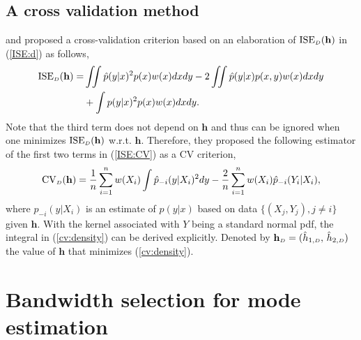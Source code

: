 \documentclass[fleqn,12pt,twoside]{article}
\newcommand{\ISE}{\mathrm{ISE}}
\newcommand{\bh}{\mathbf{h}}
\numberwithin{equation}{section}
\begin{document}
\subsection{A cross validation method}
\cite{Fan.Yim2004} and \cite{Hall.etal2004} proposed a cross-validation criterion based on an elaboration of $\ISE_{\hbox {\tiny $D$}}(\bh)$ in (\ref{ISE:d}) as follows,  
\begin{equation}\label{ISE:CV}
\begin{aligned}
\ISE_{\hbox {\tiny $D$}}(\bh) = &\iint \hat{p}(y|x)^2 p(x)w(x)dxdy - 2 \iint \hat{p}(y|x) p(x,y)w(x) dxdy\\
 & + \int p(y|x)^2 p(x)w(x)dxdy.
\end{aligned}
\end{equation}
Note that the third term does not depend on $\bh$ and thus can be ignored when one minimizes $\ISE_{\hbox {\tiny $D$}}(\bh)$ w.r.t. $\bh$. Therefore, they proposed the following estimator of the first two terms in (\ref{ISE:CV}) as a CV criterion, 
\begin{equation}\label{cv:density}
\textrm{CV}_{\hbox {\tiny $D$}}(\bh) = \frac{1}{n}\sum_{i=1}^{n}w(X_i)\int\hat{p}_{-i}(y|X_i)^2dy - \frac{2}{n}\sum_{i=1}^{n}w(X_i)\hat{p}_{-i}(Y_i|X_i),
\end{equation} 
where $\hat{p}_{-i}(y|X_i)$ is an estimate of $p(y|x)$ based on data $\{(X_j, Y_j), j\neq i\}$ given $\bh$. With the kernel associated with $Y$ being a standard normal pdf, the integral in (\ref{cv:density}) can be derived explicitly. Denoted by $\bh_{\hbox {\tiny $D$}}=(\hat{h}_{1, \hbox {\tiny $D$}},\,  \hat{h}_{2, \hbox {\tiny $D$}})$ the value of $\bh$ that minimizes (\ref{cv:density}). 

\section{Bandwidth selection for mode estimation}
\label{s:cvmode}
\end{document}
